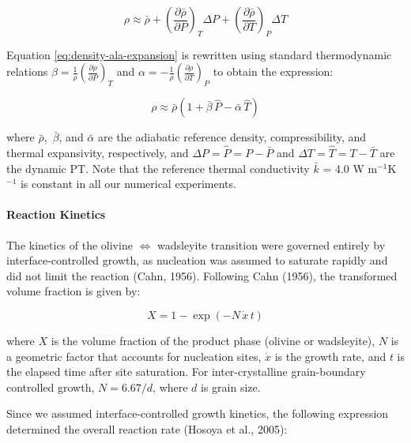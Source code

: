 \documentclass[draft,linenumbers]{agujournal2019}
\begin{document}
\begin{equation}
  \rho \approx \bar{\rho} + \left(\frac{\partial \bar{\rho}}{\partial P} \right)_T \Delta P + \left(\frac{\partial \bar{\rho}}{\partial T} \right)_P \Delta T
  \label{eq:density-ala-expansion}
\end{equation}

Equation \ref{eq:density-ala-expansion} is rewritten using standard
thermodynamic relations
\(\beta = \frac{1}{\rho} \left(\frac{\partial \rho}{\partial P}\right)_T\)
and
\(\alpha = -\frac{1}{\rho} \left(\frac{\partial \rho}{\partial T}\right)_P\)
to obtain the expression:

\begin{equation}
  \rho \approx \bar{\rho} \left(1 + \bar{\beta}\, \hat{P} - \bar{\alpha}\, \hat{T} \right)
  \label{eq:density-ala}
\end{equation}

where \(\bar{\rho}\), \(\, \bar{\beta}\), and \(\bar{\alpha}\) are the
adiabatic reference density, compressibility, and thermal expansivity,
respectively, and \(\Delta P = \hat{P} = P - \bar{P}\) and
\(\Delta T = \hat{T} = T - \bar{T}\) are the dynamic PT. Note that the
reference thermal conductivity \(\bar{k}\) = 4.0 W m\(^{-1}\)K\(^{-1}\)
is constant in all our numerical experiments.

\paragraph{Reaction Kinetics}\label{sec:reaction-kinetics}

The kinetics of the olivine \(\Leftrightarrow\) wadsleyite transition
were governed entirely by interface-controlled growth, as nucleation was
assumed to saturate rapidly and did not limit the reaction (Cahn, 1956).
Following Cahn (1956), the transformed volume fraction is given by:

\begin{equation}
  X = 1 - \exp\!\left(-N\, \dot{x}\, t \right)
  \label{eq:volume-fraction}
\end{equation}

where \(X\) is the volume fraction of the product phase (olivine or
wadsleyite), \(N\) is a geometric factor that accounts for nucleation
sites, \(\dot{x}\) is the growth rate, and \(t\) is the elapsed time
after site saturation. For inter-crystalline grain-boundary controlled
growth, \(N = 6.67/d\), where \(d\) is grain size.

Since we assumed interface-controlled growth kinetics, the following
expression determined the overall reaction rate (Hosoya et al., 2005):
\end{document}
